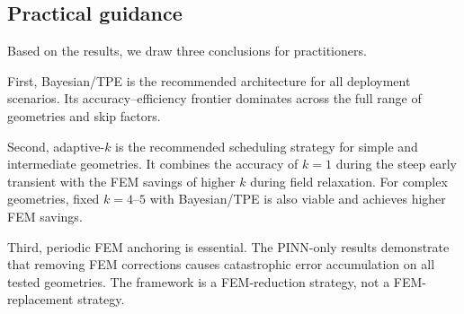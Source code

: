 \subsection{Practical guidance}

Based on the results, we draw three conclusions for practitioners.

First, Bayesian/TPE is the recommended architecture for all deployment scenarios.
Its accuracy--efficiency frontier dominates across the full range of geometries
and skip factors.

Second, adaptive-$k$ is the recommended scheduling strategy for simple and
intermediate geometries.
It combines the accuracy of $k=1$ during the steep early transient with the
FEM savings of higher $k$ during field relaxation.
For complex geometries, fixed $k=4$--$5$ with Bayesian/TPE is also viable and
achieves higher FEM savings.

Third, periodic FEM anchoring is essential.
The PINN-only results demonstrate that removing FEM corrections causes
catastrophic error accumulation on all tested geometries.
The framework is a FEM-reduction strategy, not a FEM-replacement strategy.
